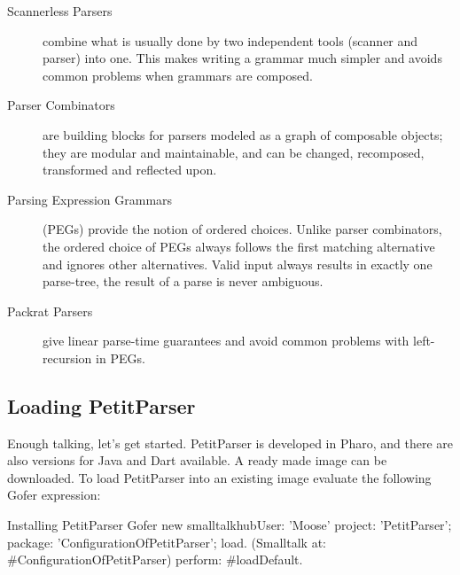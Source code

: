 \documentclass[a4paper,10pt,twoside]{book}
\begin{document}
\begin{description}
\item[Scannerless Parsers] combine what is usually done by two
  independent tools (scanner and parser) into one. This makes writing
  a grammar much simpler and avoids common problems when grammars are
  composed.

\item[Parser Combinators] are building blocks for parsers modeled as a
  graph of composable objects; they are modular and maintainable, and
  can be changed, recomposed, transformed and reflected upon.

\item[Parsing Expression Grammars] (PEGs) provide the notion of
  ordered choices. Unlike parser combinators, the ordered choice of
  PEGs always follows the first matching alternative and ignores other
  alternatives. Valid input always results in exactly one parse-tree,
  the result of a parse is never ambiguous.

\item[Packrat Parsers] give linear parse-time guarantees and avoid
  common problems with left-recursion in PEGs.
\end{description}

\subsection{Loading PetitParser}

Enough talking, let's get started. PetitParser is developed in Pharo,
and there are also versions for Java and Dart available. A ready made
image can be downloaded\footnotemark. To load PetitParser into an
existing image evaluate the following Gofer expression:


\begin{script}{Installing PetitParser}
Gofer new
  smalltalkhubUser: 'Moose' project: 'PetitParser';
  package: 'ConfigurationOfPetitParser';
  load.
(Smalltalk at: #ConfigurationOfPetitParser) perform: #loadDefault.
\end{script}


\end{document}
